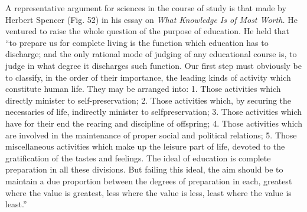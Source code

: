 \documentclass[
]{book}
\begin{document}
A representative argument for sciences in the course of study is that made by Herbert Spencer (Fig. 52) in his essay on \emph{What Knowledge Is of Most Worth.} He ventured to raise the whole question of the purpose of education. He held that ``to prepare us for complete living is the function which education has to discharge; and the only rational mode of judging of any educational course is, to judge in what degree it discharges such function. Our first step must obviously be to classify, in the order of their importance, the leading kinds of activity which constitute human life. They may be arranged into: 1. Those activities which directly minister to self-preservation; 2. Those activities which, by securing the necessaries of life, indirectly minister to selfpreservation; 3. Those activities which have for their end the rearing and discipline of offspring; 4. Those activities which are involved in the maintenance of proper social and political relations; 5. Those miscellaneous activities which make up the leisure part of life, devoted to the gratification of the tastes and feelings. The ideal of education is complete preparation in all these divisions. But failing this ideal, the aim should be to maintain a due proportion between the degrees of preparation in each, greatest where the value is greatest, less where the value is less, least where the value is least.''
\end{document}
